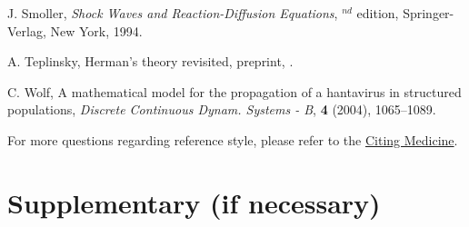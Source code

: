 \documentclass{aims}
\numberwithin{equation}{section}
\begin{document}
\begin{thebibliography}{99}
     \newblock J.  Smoller,
     \newblock \emph{Shock Waves and Reaction-Diffusion Equations},
     $^{nd}$ edition,  Springer-Verlag, New York, 1994.

\newblock A. Teplinsky,
\newblock Herman's theory revisited, preprint,
\newblock {}.

     \newblock C.  Wolf,
     \newblock A mathematical model for the propagation of a hantavirus in structured populations,
     \newblock \emph{Discrete Continuous Dynam. Systems - B}, \textbf{4} (2004), 1065--1089.

\end{thebibliography}

For more questions regarding reference style, please refer to the \href{http://www.ncbi.nlm.nih.gov/books/NBK7256/}{Citing Medicine}.

\section*{Supplementary (if necessary)}
\end{document}
